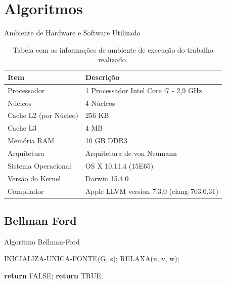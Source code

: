 \documentclass{beamer}
\begin{document}
\section{Algoritmos}
	
	\begin{frame}{Ambiente de Hardware e Software Utilizado}
		\begin{table}[H]
			\caption{Tabela com as informações de ambiente de execução do trabalho realizado.}
			\centering
			\begin{tabular}{l|l}
				\hline
				\textbf{Item}                & \textbf{Descrição} \\ \hline \hline
				Processador         & 1 Processador Intel Core i7 - 2,9 GHz         \\
				Núcleos             & 4 Núcleos \\
				Cache L2 (por Núcleo) & 256 KB \\
				Cache L3            & 4 MB \\
				Memória RAM         & 10 GB DDR3        \\
				Arquitetura         & Arquitetura de von Neumann         \\
				Sistema Operacional & OS X 10.11.4 (15E65)         \\
				Versão do Kernel    & Darwin 15.4.0 \\
				Compilador          & Apple LLVM version 7.3.0 (clang-703.0.31)         \\\hline
			\end{tabular}
		\end{table}
	\end{frame}
	
\subsection{Bellman Ford}
	\begin{frame}{Algoritmo Bellman-Ford}
		\begin{algorithm}[H]
			\caption{Bellman-Ford}\label{alg:d}
			\begin{algorithmic}[1]
				\State INICIALIZA-UNICA-FONTE(G, s);
				\State RELAXA(u, v, w);  
				\EndFor
				\EndFor
				
				\State \textbf{return} FALSE;
				\EndIf
				\EndFor
				\State \textbf{return} TRUE;
				\EndProcedure
			\end{algorithmic}
		\end{algorithm}
	\end{frame}
	
\end{document}

